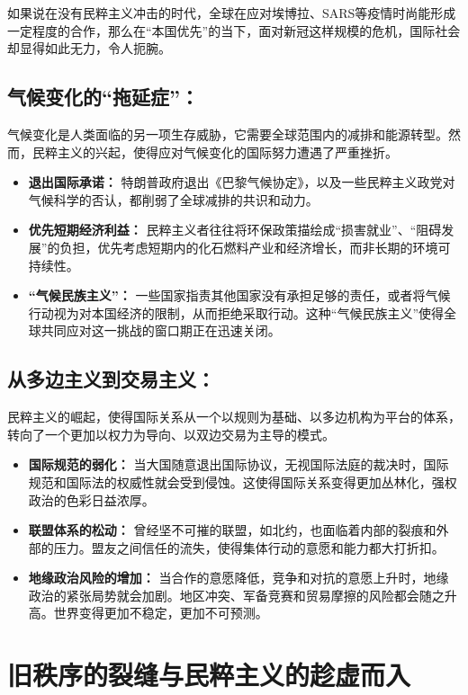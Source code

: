 如果说在没有民粹主义冲击的时代，全球在应对埃博拉、SARS等疫情时尚能形成一定程度的合作，那么在“本国优先”的当下，面对新冠这样规模的危机，国际社会却显得如此无力，令人扼腕。

\subsection{气候变化的“拖延症”：}

气候变化是人类面临的另一项生存威胁，它需要全球范围内的减排和能源转型。然而，民粹主义的兴起，使得应对气候变化的国际努力遭遇了严重挫折。

\begin{itemize}
    \item \textbf{退出国际承诺：} 特朗普政府退出《巴黎气候协定》，以及一些民粹主义政党对气候科学的否认，都削弱了全球减排的共识和动力。
    \item \textbf{优先短期经济利益：} 民粹主义者往往将环保政策描绘成“损害就业”、“阻碍发展”的负担，优先考虑短期内的化石燃料产业和经济增长，而非长期的环境可持续性。
    \item \textbf{“气候民族主义”：} 一些国家指责其他国家没有承担足够的责任，或者将气候行动视为对本国经济的限制，从而拒绝采取行动。这种“气候民族主义”使得全球共同应对这一挑战的窗口期正在迅速关闭。
\end{itemize}

\subsection{从多边主义到交易主义：}

民粹主义的崛起，使得国际关系从一个以规则为基础、以多边机构为平台的体系，转向了一个更加以权力为导向、以双边交易为主导的模式。

\begin{itemize}
    \item \textbf{国际规范的弱化：} 当大国随意退出国际协议，无视国际法庭的裁决时，国际规范和国际法的权威性就会受到侵蚀。这使得国际关系变得更加丛林化，强权政治的色彩日益浓厚。
    \item \textbf{联盟体系的松动：} 曾经坚不可摧的联盟，如北约，也面临着内部的裂痕和外部的压力。盟友之间信任的流失，使得集体行动的意愿和能力都大打折扣。
    \item \textbf{地缘政治风险的增加：} 当合作的意愿降低，竞争和对抗的意愿上升时，地缘政治的紧张局势就会加剧。地区冲突、军备竞赛和贸易摩擦的风险都会随之升高。世界变得更加不稳定，更加不可预测。
\end{itemize}

\section{旧秩序的裂缝与民粹主义的趁虚而入}

